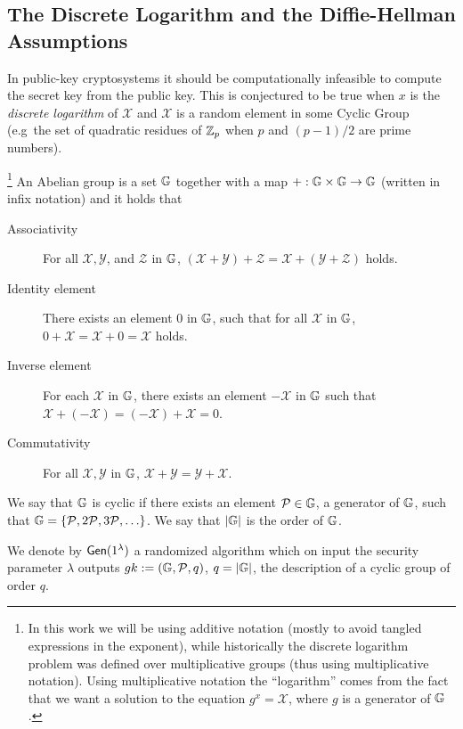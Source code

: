 \subsection{The Discrete Logarithm and the Diffie-Hellman Assumptions}
In public-key cryptosystems it should be computationally infeasible to compute the secret key from the public key.
This is conjectured to be true when $x$ is the \emph{discrete logarithm} of $\mathcal{X}$ and $\mathcal{X}$ is a random element in some Cyclic Group (e.g~the set of quadratic residues of $\mathbb{Z}_p$ when $p$ and $(p-1)/2$ are prime numbers).
\begin{definition}\footnote{In this work we will be using additive notation (mostly to avoid tangled expressions in the exponent), while historically the discrete logarithm problem was defined over multiplicative groups (thus using multiplicative notation). Using multiplicative notation the ``logarithm'' comes from the fact that we want a solution to the equation $g^x=\mathcal{X}$, where $g$ is a generator of $\mathbb{G}$.} 
An Abelian group is a set $\mathbb{G}$ together with a map $+:\mathbb{G}\times\mathbb{G}\to\mathbb{G}$ (written in infix notation) and  it holds that
\begin{description}
\item[Associativity]
For all $\mathcal{X}, \mathcal{Y}$, and $\mathcal{Z}$ in $\mathbb{G}$, $(\mathcal{X} + \mathcal{Y}) + \mathcal{Z}= \mathcal{X} + (\mathcal{Y} + \mathcal{Z})$ holds.
\item[Identity element]
There exists an element $0$ in $\mathbb{G}$, such that for all $\mathcal{X}$ in $\mathbb{G}$, $0 + \mathcal{X} = \mathcal{X} + 0 = \mathcal{X}$ holds.
\item[Inverse element]
For each $\mathcal{X}$ in $\mathbb{G}$, there exists an element $-\mathcal{X}$ in $\mathbb{G}$ such that $\mathcal{X}+ (-\mathcal{X}) = (-\mathcal{X}) +\mathcal{X} = 0$.
\item[Commutativity]
For all $\mathcal{X}, \mathcal{Y}$ in $\mathbb{G}$, $\mathcal{X} + \mathcal{Y}=\mathcal{Y}+\mathcal{X}$.
\end{description}
We say that $\mathbb{G}$ is cyclic if there exists an element $\mathcal{P}\in\mathbb{G}$, a generator of $\mathbb{G}$, such that $\mathbb{G}=\{\mathcal{P}, 2\mathcal{P}, 3\mathcal{P},\ldots\}$. We say that $|\mathbb{G}|$ is the order of $\mathbb{G}$.

We denote by $\mathsf{Gen}(1^\lambda)$ a randomized algorithm which on input the security parameter $\lambda$ outputs $gk:=(\mathbb{G},\mathcal{P},q)$, $q=|\mathbb{G}|$, the description of a cyclic group of order $q$.
\end{definition}

